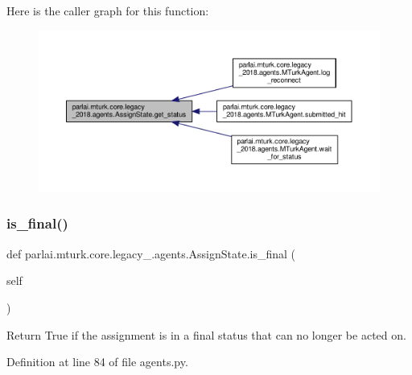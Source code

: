 Here is the caller graph for this function\+:
\nopagebreak
\begin{figure}[H]
\begin{center}
\leavevmode
\includegraphics[width=350pt]{classparlai_1_1mturk_1_1core_1_1legacy__2018_1_1agents_1_1AssignState_aa06c7d109d7b208a9dcdef0d3fa6c90f_icgraph}
\end{center}
\end{figure}
\mbox{\label{classparlai_1_1mturk_1_1core_1_1legacy__2018_1_1agents_1_1AssignState_ac1c93e39da15b6daee60058af9d2f04a}} 
\subsubsection{\texorpdfstring{is\+\_\+final()}{is\_final()}}
{\footnotesize\ttfamily def parlai.\+mturk.\+core.\+legacy\+\_.\+agents.\+Assign\+State.\+is\+\_\+final (\begin{DoxyParamCaption}\item[{}]{self }\end{DoxyParamCaption})}

\begin{DoxyVerb}Return True if the assignment is in a final status that
can no longer be acted on.
\end{DoxyVerb}
 

Definition at line 84 of file agents.\+py.




